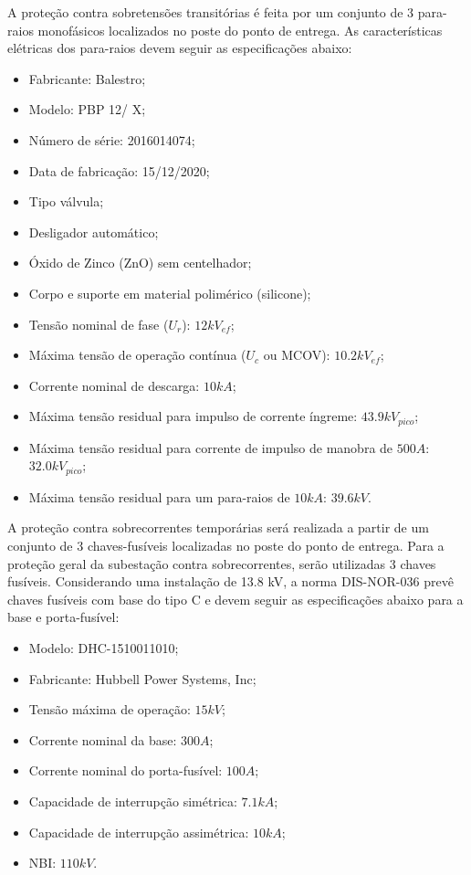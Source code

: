 A proteção contra sobretensões transitórias é feita por um conjunto de 3 para-raios monofásicos localizados no poste do ponto de entrega. As características elétricas dos para-raios devem seguir as especificações abaixo:


\begin{itemize}
    \item Fabricante: Balestro;
    \item Modelo: PBP 12/ X;
    \item Número de série: 2016014074;
    \item Data de fabricação: 15/12/2020;
    \item Tipo válvula;
    \item Desligador automático;
    \item Óxido de Zinco (ZnO) sem centelhador;
    \item Corpo e suporte em material polimérico (silicone);
    \item Tensão nominal de fase ($U_r$): $12 kV_{ef}$;
    \item Máxima tensão de operação contínua ($U_c$ ou MCOV): $10.2 kV_{ef}$;
    \item Corrente nominal de descarga: $10 kA$;
    \item Máxima tensão residual para impulso de corrente íngreme: $43.9 kV_{pico}$;
    \item Máxima tensão residual para corrente de impulso de manobra de $500A$: $32.0 kV_{pico}$;
    \item Máxima tensão residual para um para-raios de $10 kA$: $39.6 kV$.
\end{itemize}

A proteção contra sobrecorrentes temporárias será realizada a partir de um conjunto de 3 chaves-fusíveis localizadas no poste do ponto de entrega. Para a proteção geral da subestação contra sobrecorrentes, serão utilizadas 3 chaves fusíveis. Considerando uma instalação de 13.8 kV, a norma DIS-NOR-036 prevê chaves fusíveis com base do tipo C e devem seguir as especificações abaixo para a base e porta-fusível:


\begin{itemize}
    \item Modelo: DHC-1510011010;
    \item Fabricante: Hubbell Power Systems, Inc;
    \item Tensão máxima de operação: $15 kV$;
    \item Corrente nominal da base: $300 A$; 
    \item Corrente nominal do porta-fusível: $100 A$;
    \item Capacidade de interrupção simétrica: $7.1 kA$;
    \item Capacidade de interrupção assimétrica: $10 kA$;
    \item NBI: $110 kV$.
\end{itemize}

